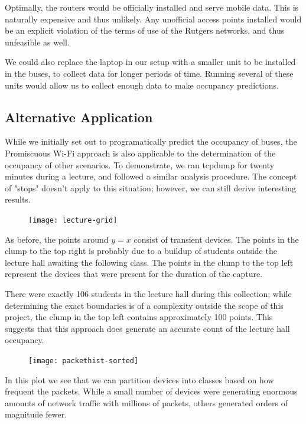 \documentclass[11pt,journal,compsoc]{IEEEtran} %
\begin{document}
Optimally, the routers would be officially installed and serve mobile data.
	This is naturally expensive and thus unlikely.
	Any unofficial access points installed would be an explicit violation of the terms of use of the Rutgers networks, and thus unfeasible as well.

We could also replace the laptop in our setup with a smaller unit to be installed in the buses, to collect data for longer periods of time.
	Running several of these units would allow us to collect enough data to make occupancy predictions.

\subsection*{Alternative Application}
	While we initially set out to programatically predict the occupancy of buses, the Promiscuous Wi-Fi approach is also applicable to the determination of the occupancy of other scenarios.
	To demonstrate, we ran tcpdump for twenty minutes during a lecture, and followed a similar analysis procedure.
	The concept of "stops" doesn't apply to this situation; however, we can still derive interesting results.

	\begin{figure}[!t]
	  \texttt{[image: lecture-grid]}
      \label{fig:probgrid}
	\end{figure}

	As before, the points around \(y=x\) consist of transient devices.
	The points in the clump to the top right is probably due to a buildup of students outside the lecture hall awaiting the following class.
	The points in the clump to the top left represent the devices that were present for the duration of the capture.
	
	There were exactly 106 students in the lecture hall during this collection; while determining the exact boundaries is of a complexity outside the scope of this project, the clump in the top left contains approximately 100 points.
	This suggests that this approach does generate an accurate count of the lecture hall occupancy.

	\begin{figure}[!t]
	  \texttt{[image: packethist-sorted]}
      \label{fig:probhist}
	\end{figure}

	In this plot we see that we can partition devices into classes based on how frequent the packets.
	While a small number of devices were generating enormous amounts of network traffic with millions of packets, others generated orders of magnitude fewer.
	
\end{document}
